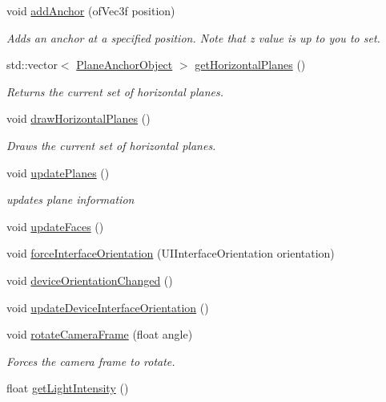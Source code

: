 \begin{DoxyCompactItemize}
void \hyperlink{class_a_r_processor_af4e627093ee86883736c89c2a627af42}{add\+Anchor} (of\+Vec3f position)
\begin{DoxyCompactList}\small\item\em Adds an anchor at a specified position. Note that z value is up to you to set. \end{DoxyCompactList}\item 
std\+::vector$<$ \hyperlink{struct_a_r_objects_1_1_plane_anchor_object}{Plane\+Anchor\+Object} $>$ \hyperlink{class_a_r_processor_a3cd70af245be375d56a06e2ea8d068f9}{get\+Horizontal\+Planes} ()
\begin{DoxyCompactList}\small\item\em Returns the current set of horizontal planes. \end{DoxyCompactList}\item 
void \hyperlink{class_a_r_processor_a6a61a7e03821410bc1a715fd32159662}{draw\+Horizontal\+Planes} ()
\begin{DoxyCompactList}\small\item\em Draws the current set of horizontal planes. \end{DoxyCompactList}\item 
void \hyperlink{class_a_r_processor_aaa1488d9082ec598fd4aeb5c5c43d999}{update\+Planes} ()
\begin{DoxyCompactList}\small\item\em updates plane information \end{DoxyCompactList}\item 
void \hyperlink{class_a_r_processor_a53dbd6040f277ee7f7ef08f79240cdfb}{update\+Faces} ()
\item 
void \hyperlink{class_a_r_processor_a1100d09ed407ae8d1f4e95a9698e548d}{force\+Interface\+Orientation} (U\+I\+Interface\+Orientation orientation)
\item 
void \hyperlink{class_a_r_processor_ac065970f90243b08b9d004a4220d0345}{device\+Orientation\+Changed} ()
\item 
void \hyperlink{class_a_r_processor_a48797c1a249b2f115d0151396bc1eb9c}{update\+Device\+Interface\+Orientation} ()
\item 
void \hyperlink{class_a_r_processor_a2514281144c680e13c02562c74746ceb}{rotate\+Camera\+Frame} (float angle)
\begin{DoxyCompactList}\small\item\em Forces the camera frame to rotate. \end{DoxyCompactList}\item 
float \hyperlink{class_a_r_processor_a3e6d897db3a54b004f3eac337110765e}{get\+Light\+Intensity} ()

\end{DoxyCompactItemize}

